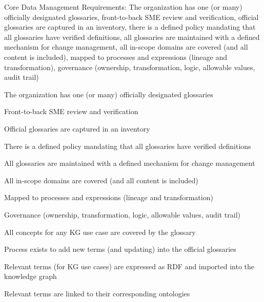 \kgmmscoringsection

Core Data Management Requirements: The organization has one (or many) officially designated glossaries,
front-to-back SME review and verification, official glossaries are captured in an inventory,
there is a defined policy mandating that all glossaries have verified definitions,
all glossaries are maintained with a defined mechanism for change management,
all in-scope domains are covered (and all content is included), mapped to processes and expressions
(lineage and transformation), governance (ownership, transformation, logic, allowable values, audit trail)

\kgmmscoringlevelOne

\begin{scoring}

  \item The organization has one (or many) officially designated glossaries
  \item Front-to-back SME review and verification
  \item Official glossaries are captured in an inventory
  \item There is a defined policy mandating that all glossaries have verified definitions
  \item All glossaries are maintained with a defined mechanism for change management
  \item All in-scope domains are covered (and all content is included)
  \item Mapped to processes and expressions (lineage and transformation)
  \item Governance (ownership, transformation, logic, allowable values, audit trail)

\end{scoring}

\kgmmscoringlevelTwo

\begin{scoring}

  \item All concepts for any KG use case are covered by the glossary
  \item Process exists to add new terms (and updating) into the official glossaries

\end{scoring}

\kgmmscoringlevelThree

\begin{scoring}

  \item Relevant terms (for KG use cases) are expressed as RDF and imported into the knowledge graph
  \item Relevant terms are linked to their corresponding ontologies

\end{scoring}

